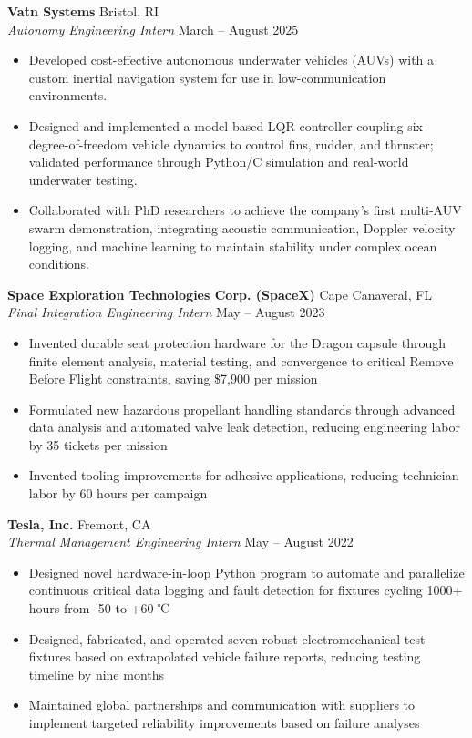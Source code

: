 \documentclass[10pt]{article}
\begin{document}
\textbf{Vatn Systems} \hfill Bristol, RI \\
\textit{Autonomy Engineering Intern} \hfill March -- August 2025
\begin{itemize}[left=0em, itemsep=0.3em] 
    \footnotesize
    \fontsize{10pt}{11pt}\selectfont 
    \item Developed cost-effective autonomous underwater vehicles (AUVs) with a custom inertial navigation system for use in low-communication environments.
    \item Designed and implemented a model-based LQR controller coupling six-degree-of-freedom vehicle dynamics to control fins, rudder, and thruster; validated performance through Python/C simulation and real-world underwater testing.
    \item Collaborated with PhD researchers to achieve the company’s first multi-AUV swarm demonstration, integrating acoustic communication, Doppler velocity logging, and machine learning to maintain stability under complex ocean conditions.
\end{itemize}

\textbf{Space Exploration Technologies Corp. (SpaceX)} \hfill Cape Canaveral, FL \\
\textit{Final Integration Engineering Intern} \hfill May -- August 2023
\begin{itemize}[left=0em, itemsep=0.3em] %
    \footnotesize
    \fontsize{10pt}{11pt}\selectfont 
    \item Invented durable seat protection hardware for the Dragon capsule through finite element analysis, material testing, and convergence to critical Remove Before Flight constraints, saving \$7,900 per mission
    \item Formulated new hazardous propellant handling standards through advanced data analysis and automated valve leak detection, reducing engineering labor by 35 tickets per mission
    \item Invented tooling improvements for adhesive applications, reducing technician labor by 60 hours per campaign
\end{itemize}
 
\textbf{Tesla, Inc.} \hfill Fremont, CA \\
\textit{Thermal Management Engineering Intern} \hfill May -- August 2022
\begin{itemize}[left=0em, itemsep=0.3em] %
    \footnotesize
    \fontsize{10pt}{11pt}\selectfont 
    \item Designed novel hardware-in-loop Python program to automate and parallelize continuous critical data logging and fault detection for fixtures cycling 1000+ hours from -50 to +60 ℃
    \item Designed, fabricated, and operated seven robust electromechanical test fixtures based on extrapolated vehicle failure reports, reducing testing timeline by nine months
    \item Maintained global partnerships and communication with suppliers to implement targeted reliability improvements based on failure analyses 
\end{itemize}
\end{document}
